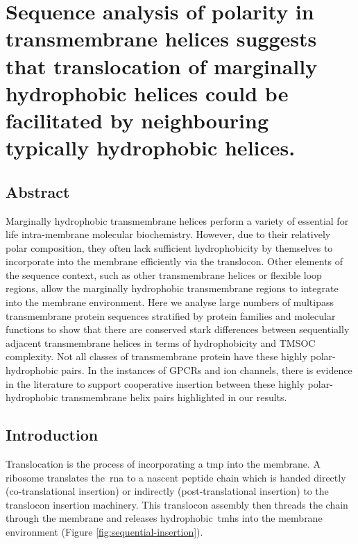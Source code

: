 \chapter{Sequence analysis of polarity in transmembrane helices suggests that translocation of marginally hydrophobic helices could be facilitated by neighbouring typically hydrophobic helices.}
\section{Abstract}

Marginally hydrophobic transmembrane helices perform a variety of essential for life intra-membrane molecular biochemistry.
However, due to their relatively polar composition, they often lack sufficient hydrophobicity by themselves to incorporate into the membrane efficiently via the translocon.
Other elements of the sequence context, such as other transmembrane helices or flexible loop regions, allow the marginally hydrophobic transmembrane regions to integrate into the membrane environment.
Here we analyse large numbers of multipass transmembrane protein sequences stratified by protein families and molecular functions to show that there are conserved stark differences between sequentially adjacent transmembrane helices in terms of hydrophobicity and TMSOC complexity.
Not all classes of transmembrane protein have these highly polar\--hydrophobic pairs.
In the instances of GPCRs and ion channels, there is evidence in the literature to support cooperative insertion between these highly polar\--hydrophobic transmembrane helix pairs highlighted in our results.


\section{Introduction}

Translocation is the process of incorporating a \gls{tmp} into the membrane.
A ribosome translates the~\gls{rna} to a nascent peptide chain which is handed directly (co-translational insertion) or indirectly (post\--translational insertion) to the translocon insertion machinery.
This translocon assembly then threads the chain through the membrane and releases hydrophobic~\gls{tmh}s into the membrane environment (Figure \ref{fig:sequential-insertion}).

